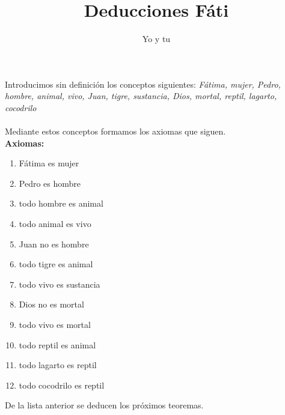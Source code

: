 ﻿\documentclass[12pt]{book}
\title{Deducciones Fáti}
\author{Yo y tu}
\date{}
\begin{document}
\maketitle
 Introducimos sin definición los conceptos siguientes: \textit{
Fátima, mujer, Pedro, hombre, animal, vivo, Juan, tigre, sustancia, Dios, mortal, reptil, lagarto, cocodrilo}
\\
\\Mediante estos conceptos formamos los axiomas que siguen. \\
\textbf{Axiomas:}
\begin{enumerate}
\item Fátima es mujer
\item Pedro es hombre
\item todo hombre es animal
\item todo animal es vivo
\item Juan no es hombre
\item todo tigre es animal
\item todo vivo es sustancia
\item Dios no es mortal
\item todo vivo es mortal
\item todo reptil es animal
\item todo lagarto es reptil
\item todo cocodrilo es reptil
\end{enumerate}De la lista anterior se deducen los próximos teoremas. \\
\end{document}
